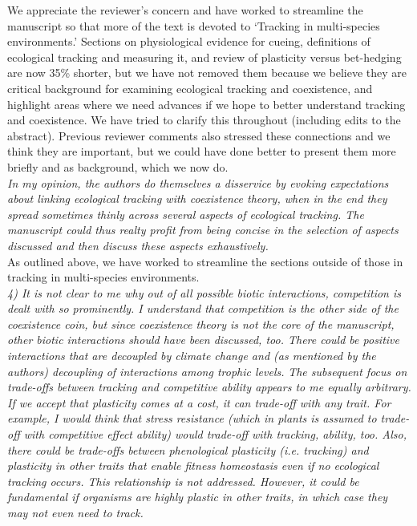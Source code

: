 \documentclass[11pt]{article}
\begin{document}
We appreciate the reviewer's concern and have worked to streamline the manuscript so that more of the text is devoted to `Tracking in multi-species environments.' Sections on physiological evidence for cueing, definitions of ecological
tracking and measuring it, and review of plasticity versus bet-hedging are now 35\% shorter, but we have not removed them because we believe they are critical background for examining ecological tracking and coexistence, and highlight areas where we need advances if we hope to better understand tracking and coexistence. We have tried to clarify this throughout (including edits to the abstract). Previous reviewer comments also stressed these connections and we think they are important, but we could have done better to present them more briefly and as background, which we now do. \\

\emph{In my opinion, the authors do themselves a disservice by evoking expectations about linking
ecological tracking with coexistence theory, when in the end they spread sometimes thinly
across several aspects of ecological tracking. The manuscript could thus realty profit from
being concise in the selection of aspects discussed and then discuss these aspects
exhaustively.}\\

As outlined above, we have worked to streamline the sections outside of those in tracking in multi-species environments.\\

\emph{4) It is not clear to me why out of all possible biotic interactions, competition is dealt
with so prominently. I understand that competition is the other side of the coexistence coin,
but since coexistence theory is not the core of the manuscript, other biotic interactions
should have been discussed, too. There could be positive interactions that are decoupled by
climate change and (as mentioned by the authors) decoupling of interactions among trophic
levels.}
\emph{The subsequent focus on trade-offs between tracking and competitive ability appears to me
equally arbitrary. If we accept that plasticity comes at a cost, it can trade-off with any
trait. For example, I would think that stress resistance (which in plants is assumed to
trade-off with competitive effect ability) would trade-off with tracking, ability, too. Also,
there could be trade-offs between phenological plasticity (i.e. tracking) and plasticity in
other traits that enable fitness homeostasis even if no ecological tracking occurs. This
relationship is not addressed. However, it could be fundamental if organisms are highly
plastic in other traits, in which case they may not even need to track.}\\
\end{document}
